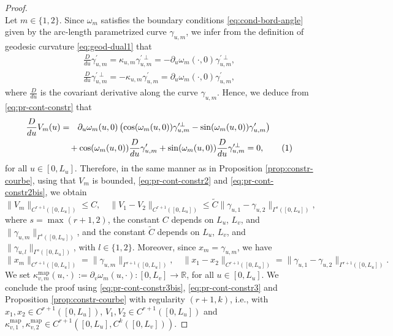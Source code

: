 \documentclass{article}
\newcommand{\R}{\mathbb{R}}
\newcommand{\ko}{\kappa}
\newcommand{\kop}{\kappa^{\mathrm{map}}}
\newcommand{\DU}{\partial_{u}}
\theoremstyle{remark}
\theoremstyle{prpart}
\newcommand{\snum}{\addtocounter{equation}{1}\tag{\theequation}}
\begin{document}
\begin{proof}
\begin{equation}
 \end{equation}
 Let $m\in\{1,2\}$. Since $\omega_m$ satisfies the boundary conditions \eqref{eq:cond-bord-angle} given by the arc-length parametrized curve $\gamma_{u,m}$, we infer from the definition of geodesic curvature \eqref{eq:geod-dual1} that
  \begin{align*}
   \frac{D}{du}\gamma_{u,m}^\prime =\ko_{u,m}\gamma_{u,m}^{\prime\perp}= -\DU\omega_m(\cdot,0)\gamma_{u,m}^{\prime\perp},\\ 
   \frac{D}{du}\gamma_{u,m}^{\prime\perp} =-\ko_{u,m}\gamma_{u,m}^{\prime}= \DU\omega_m(\cdot,0)\gamma_{u,m}^{\prime},
  \end{align*}
  where $\frac{D}{du}$ is the covariant derivative along the curve $\gamma_{u,m}$. Hence, we deduce from \eqref{eq:pr-cont-constr} that
\begin{align*}
  \frac{D}{du}V_m(u) &=~~ \partial_u\omega_m(u,0)\left(\cos(\omega_m(u,0))\gamma_{u,m}^{\prime\perp} - \sin(\omega_m(u,0))\gamma_{u,m}'\right) \\
&\quad+ \cos(\omega_m(u,0))\frac{D}{du}\gamma_{u,m}^\prime + \sin(\omega_m(u,0))\frac{D}{du}\gamma_{u,m}^{\prime\perp}= 0,\snum\label{eq:pr-cont-constr2bis}
\end{align*}
for all $u\in[0,L_u]$. Therefore, in the same manner as in Proposition \ref{prop:constr-courbe}, using that $V_m$ is bounded, \eqref{eq:pr-cont-constr2} and \eqref{eq:pr-cont-constr2bis}, we obtain 
 \begin{equation}\label{eq:pr-cont-constr3bis}
\|V_m\|_{C^{r+1}([0,L_u])}\leq C,\quad\|V_1-V_2\|_{C^{r+1}([0,L_u])}\leq \tilde C\|\gamma_{u,1}-\gamma_{u,2}\|_{\Gamma^s([0,L_u])},
\end{equation}
where $s=\max(r+1,2)$, the constant $C$ depends on $L_u$, $L_v$, and $\|\gamma_{u,m}\|_{\Gamma^{s}([0,L_u])}$, and the constant $\tilde C$ depends on $L_u$, $L_v$, and $\|\gamma_{u,l}\|_{\Gamma^{s}([0,L_u])}$, with $l\in\{1,2\}$.
Moreover, since $x_m=\gamma_{u,m}$, we have%
\begin{equation}\label{eq:pr-cont-constr3}
\|x_m\|_{C^{r+1}([0,L_u])}= \|\gamma_{u,m}\|_{\Gamma^{r+1}([0,L_u])},\quad\|x_1-x_2\|_{C^{r+1}([0,L_u])}= \|\gamma_{u,1}-\gamma_{u,2}\|_{\Gamma^{r+1}([0,L_u])}.
\end{equation}
We set $\kop_{v,m}(u,\cdot) := \partial_v\omega_m(u,\cdot):[0,L_v]\to\R$, for all $u\in[0,L_u]$.
 We conclude the proof using \eqref{eq:pr-cont-constr3bis}, \eqref{eq:pr-cont-constr3} and Proposition \ref{prop:constr-courbe} with regularity $(r{+}1,k)$, i.e., with $x_1,x_2\in C^{r+1}([0,L_u])$, $V_1,V_2\in C^{r+1}([0,L_u])$ and $\kop_{v,1},\kop_{v,2}\in C^{r+1}([0,L_u],C^{k}([0,L_v]))$.
\end{proof}
\end{document}
